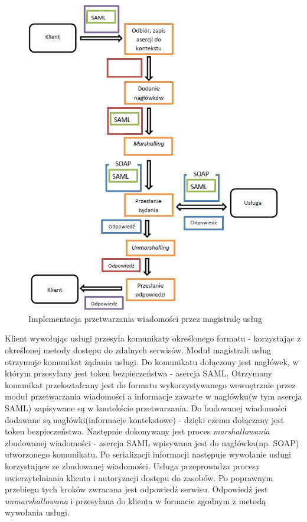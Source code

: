 	\begin{figure}[h]
		\centering
		\includegraphics{img/esbRoute.jpg}
		\caption{Implementacja przetwarzania wiadomości przez magistralę usług}
		\label{ESB route}
	\end{figure}

	Klient wywołując usługi przesyła komunikaty określonego formatu - korzystając z określonej metody dostępu do zdalnych serwisów. Moduł magistrali usług otrzymuje komunikat żądania usługi. Do komunikatu dołączony jest nagłówek, w którym przesyłany jest token bezpieczeństwa - asercja SAML. Otrzymany komunikat przekształcany jest do formatu wykorzystywanego wewnętrznie przez moduł przetwarzania wiadomości a informacje zawarte w nagłówku(w tym asercja SAML) zapisywane są w kontekście przetwarzania. Do budowanej wiadomości dodawane są nagłówki(informacje kontekstowe) - dzięki czemu dołączany jest token bezpieczeństwa. Następnie dokonywany jest proces \textit{marshallowania} zbudowanej wiadomości - asercja SAML wpisywana jest do nagłówka(np. SOAP) utworzonego komunikatu. Po serializacji informacji następuje wywołanie usługi korzystające ze zbudowanej wiadomości. Usługa przeprowadza procesy uwierzytelniania klienta i autoryzacji dostępu do zasobów. Po poprawnym przebiegu tych kroków zwracana jest odpowiedź serwisu. Odpowiedź jest \textit{unmarshallowana} i przesyłana do klienta w formacie zgodnym z metodą wywołania usługi.

